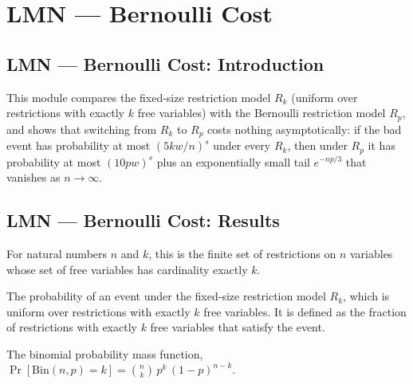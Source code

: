 \section{LMN --- Bernoulli Cost}
\subsection*{LMN --- Bernoulli Cost: Introduction}
This module compares the fixed-size restriction model $R_k$ (uniform over restrictions
with exactly $k$ free variables) with the Bernoulli restriction model $R_p$, and shows
that switching from $R_k$ to $R_p$ costs nothing asymptotically: if the bad event has
probability at most $(5kw/n)^s$ under every $R_k$, then under $R_p$ it has probability at
most $(10pw)^s$ plus an exponentially small tail $e^{-np/3}$ that vanishes as $n \to \infty$.

\subsection*{LMN --- Bernoulli Cost: Results}

\begin{definition}
\label{BernoulliCost.fixedSizeRestrs}
\leanok
{}
For natural numbers $n$ and $k$, this is the finite set of restrictions on $n$ variables
whose set of free variables has cardinality exactly $k$.
\end{definition}

\begin{definition}
\label{BernoulliCost.fixedSizeRestrProb}
\leanok
{}
The probability of an event under the fixed-size restriction model $R_k$, which is uniform
over restrictions with exactly $k$ free variables. It is defined as the fraction of
restrictions with exactly $k$ free variables that satisfy the event.
\end{definition}

\begin{definition}
\label{BernoulliCost.binomialPMF}
\leanok
The binomial probability mass function, $\Pr[\mathrm{Bin}(n,p) = k] = \binom{n}{k}\, p^k\, (1-p)^{n-k}$.
\end{definition}

